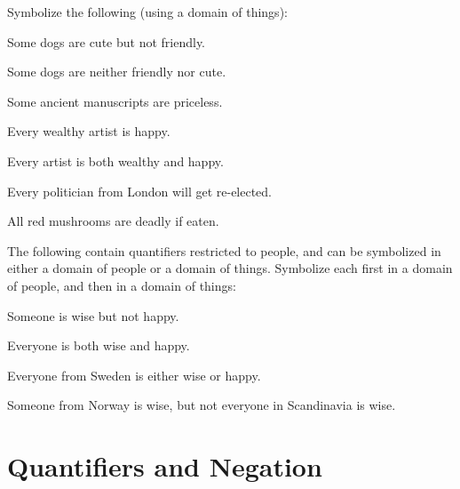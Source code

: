 \practiceproblems

\problempart Symbolize the following (using a domain of things): 


\begin{earg}
\item Some dogs are cute but not friendly.

\item Some dogs are neither friendly nor cute.

\item Some ancient manuscripts are priceless.

\item  Every wealthy artist is happy.

\item Every artist is both wealthy and happy.

\item Every politician from London will get re-elected.

\item All red mushrooms are deadly if eaten.
\end{earg}

\problempart  The following contain quantifiers restricted to people, and can be symbolized in either a domain of people or a domain of things.  Symbolize each first in a domain of people, and then in a domain of things:

\begin{earg}
\item Someone is wise but not happy.
\item Everyone is both wise and happy.
\item Everyone from Sweden is either wise or happy.
\item Someone from Norway is wise, but not everyone in Scandinavia is wise.
\end{earg}





\section{Quantifiers and Negation}




